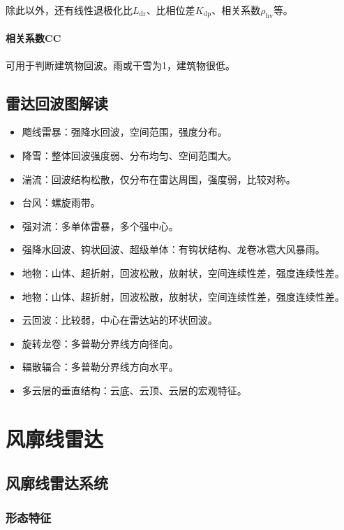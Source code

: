 \documentclass[UTF8,11pt]{ctexbook}
\begin{document}
除此以外，还有线性退极化比\(L_\mathrm{dr}\)、比相位差\(K_\mathrm{dp}\)、相关系数\(\rho_\mathrm{hv}\)等。

\subsubsection{相关系数CC}

可用于判断建筑物回波。雨或干雪为1，建筑物很低。

\section{雷达回波图解读}
\begin{itemize}
    \item 飑线雷暴：强降水回波，空间范围，强度分布。
    \item 降雪：整体回波强度弱、分布均匀、空间范围大。
    \item 湍流：回波结构松散，仅分布在雷达周围，强度弱，比较对称。
    \item 台风：螺旋雨带。
    \item 强对流：多单体雷暴，多个强中心。
    \item 强降水回波、钩状回波、超级单体：有钩状结构、龙卷冰雹大风暴雨。
    \item 地物：山体、超折射，回波松散，放射状，空间连续性差，强度连续性差。
    \item 地物：山体、超折射，回波松散，放射状，空间连续性差，强度连续性差。
    \item 云回波：比较弱，中心在雷达站的环状回波。
    \item 旋转龙卷：多普勒分界线方向径向。
    \item 辐散辐合：多普勒分界线方向水平。
    \item 多云层的垂直结构：云底、云顶、云层的宏观特征。
\end{itemize}

\chapter{风廓线雷达}

\section{风廓线雷达系统}

\subsection{形态特征}
\end{document}
